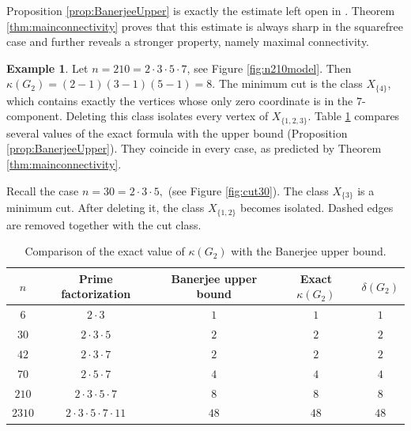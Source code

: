 \documentclass[12pt]{article}
\theoremstyle{definition}
\newtheorem{example}[theorem]{Example}
\begin{document}
	 Proposition \ref{prop:BanerjeeUpper} is exactly the estimate left open in \cite{Banerjee2022}. Theorem \ref{thm:mainconnectivity} proves that this estimate is always sharp in the squarefree case and further reveals a stronger property, namely maximal connectivity. 	
	\begin{example}\label{ex:kappa210}
		Let $n=210=2\cdot 3\cdot 5\cdot 7$, see Figure \ref{fig:n210model}. Then
		$ \kappa(G_2)=(2-1)(3-1)(5-1)=8. $ The minimum cut is the class $X_{\{4\}}$, which contains exactly the vertices whose only zero coordinate is in the $7$-component. Deleting this class isolates every vertex of $X_{\{1,2,3\}}$. Table \ref{tab:connectivitycompare} compares several values of the exact formula with the  upper bound (Proposition \ref{prop:BanerjeeUpper}). They coincide in every case, as predicted by Theorem \ref{thm:mainconnectivity}.
	\end{example}
	Recall the case $n=30=2\cdot 3\cdot 5,$ (see Figure \ref{fig:cut30}). The class $X_{\{3\}}$ is a minimum cut. After deleting it, the class $X_{\{1,2\}}$ becomes isolated. Dashed edges are removed together with the cut class.
	\begin{table}[H]
		\centering
		\caption{Comparison of the exact value of $\kappa(G_2)$ with the Banerjee upper bound.}
		\label{tab:connectivitycompare}
		\begin{tabular}{ccccc}
			\toprule
			$n$ & Prime factorization & Banerjee upper bound & Exact $\kappa(G_2)$ & $\delta(G_2)$ \\
			\midrule
			$6$ & $2\cdot 3$ & $1$ & $1$ & $1$ \\
			$30$ & $2\cdot 3\cdot 5$ & $2$ & $2$ & $2$ \\
			$42$ & $2\cdot 3\cdot 7$ & $2$ & $2$ & $2$ \\
			$70$ & $2\cdot 5\cdot 7$ & $4$ & $4$ & $4$ \\
			$210$ & $2\cdot 3\cdot 5\cdot 7$ & $8$ & $8$ & $8$ \\
			$2310$ & $2\cdot 3\cdot 5\cdot 7\cdot 11$ & $48$ & $48$ & $48$ \\
			\bottomrule
		\end{tabular}
	\end{table}
	
\end{document}
